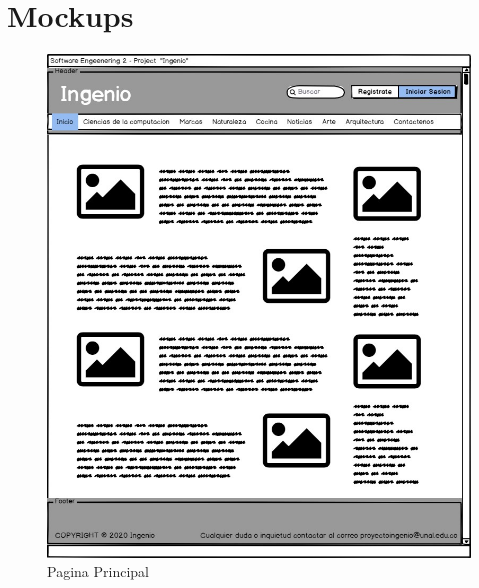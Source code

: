 \documentclass[a4paper,12 pt]{article}
\begin{document}
\section{Mockups}
\begin{figure}[H]
    \centering
    \includegraphics[scale = 1]{images/PaginaPrincipal.jpg}
    \caption{Pagina Principal}
    \label{F100}
\end{figure}{}
\end{document}
